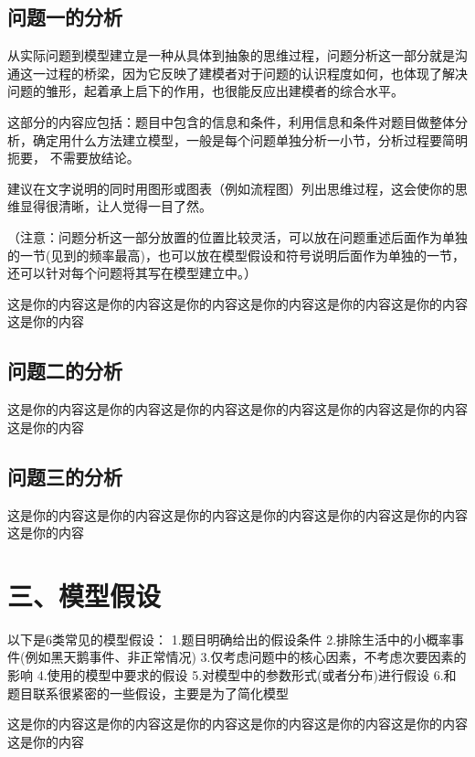 \documentclass{article}
\begin{document}
\subsection{问题一的分析}
从实际问题到模型建立是一种从具体到抽象的思维过程，问题分析这一部分就是沟通这一过程的桥梁，因为它反映了建模者对于问题的认识程度如何，也体现了解决问题的雏形，起着承上启下的作用，也很能反应出建模者的综合水平。

这部分的内容应包括：题目中包含的信息和条件，利用信息和条件对题目做整体分析，确定用什么方法建立模型，一般是每个问题单独分析一小节，分析过程要简明扼要， 不需要放结论。

建议在文字说明的同时用图形或图表（例如流程图）列出思维过程，这会使你的思维显得很清晰，让人觉得一目了然。

（注意：问题分析这一部分放置的位置比较灵活，可以放在问题重述后面作为单独的一节(见到的频率最高)，也可以放在模型假设和符号说明后面作为单独的一节，还可以针对每个问题将其写在模型建立中。）

这是你的内容这是你的内容这是你的内容这是你的内容这是你的内容这是你的内容这是你的内容
\subsection{问题二的分析}
这是你的内容这是你的内容这是你的内容这是你的内容这是你的内容这是你的内容这是你的内容
\subsection{问题三的分析}
这是你的内容这是你的内容这是你的内容这是你的内容这是你的内容这是你的内容这是你的内容
\section{三、模型假设}
以下是6类常见的模型假设：
1.题目明确给出的假设条件
2.排除生活中的小概率事件(例如黑天鹅事件、非正常情况)
3.仅考虑问题中的核心因素，不考虑次要因素的影响
4.使用的模型中要求的假设
5.对模型中的参数形式(或者分布)进行假设
6.和题目联系很紧密的一些假设，主要是为了简化模型

这是你的内容这是你的内容这是你的内容这是你的内容这是你的内容这是你的内容这是你的内容


\end{document}

